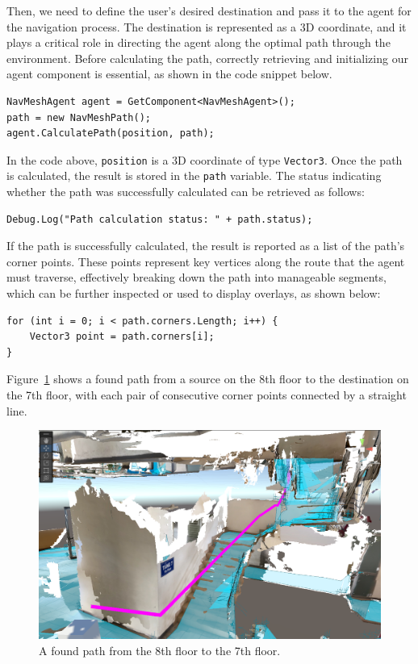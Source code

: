 Then, we need to define the user's desired destination and pass it to the agent for the navigation process. The destination is represented as a 3D coordinate, and it plays a critical role in directing the agent along the optimal path through the environment. Before calculating the path, correctly retrieving and initializing our agent component is essential, as shown in the code snippet below.

\begin{lstlisting}[style=cSharp]
NavMeshAgent agent = GetComponent<NavMeshAgent>();
path = new NavMeshPath();
agent.CalculatePath(position, path);
\end{lstlisting}

In the code above, \texttt{position} is a 3D coordinate of type \texttt{Vector3}. Once the path is calculated, the result is stored in the \texttt{path} variable. The status indicating whether the path was successfully calculated can be retrieved as follows:

\begin{lstlisting}[style=cSharp]
Debug.Log("Path calculation status: " + path.status);
\end{lstlisting}

If the path is successfully calculated, the result is reported as a list of the path's corner points. These points represent key vertices along the route that the agent must traverse, effectively breaking down the path into manageable segments, which can be further inspected or used to display overlays, as shown below:

\begin{lstlisting}[style=cSharp]
for (int i = 0; i < path.corners.Length; i++) {
    Vector3 point = path.corners[i];
}
\end{lstlisting}

Figure~\ref{fig:navigation-3} shows a found path from a source on the 8th floor to the destination on the 7th floor, with each pair of consecutive corner points connected by a straight line.

\begin{figure}[ht]
  \centering
  \includegraphics[scale=0.5]{content/resources/images/chap-problems-solutions/navigation-3.PNG}
  \caption{A found path from the 8th floor to the 7th floor.}
  \label{fig:navigation-3}
\end{figure}

